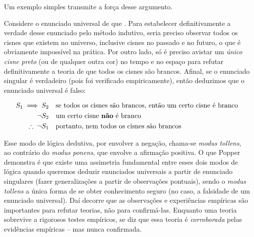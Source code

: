 \documentclass[./main.tex]{subfiles}
\begin{document}
\par Um exemplo simples transmite a força desse argumento. 

\par Considere o enunciado universal de que . Para estabelecer definitivamente a verdade desse enunciado pelo método indutivo, seria preciso observar todos os cisnes que existem no universo, inclusive cisnes no passado e no futuro, o que é obviamente impossível na prática. Por outro lado, só é preciso avistar um \textit{único cisne preto} (ou de qualquer outra cor) no tempo e no espaço para refutar definitivamente a \gls{teoria} de que todos os cisnes são brancos. Afinal, se o enunciado singular  é verdadeiro (pois foi verificado empiricamente), então deduzimos que o enunciado universal  é falso:
\begin{linenomath*}
    \begin{align*}
        S_1 \implies S_2 & \quad \textnormal{se todos os cisnes são brancos, então um certo cisne é branco} \\
        \neg S_2 & \quad \textnormal{um certo cisne \textbf{não} é branco}\\
        \therefore\;\neg S_1 & \quad \textnormal{portanto, nem todos os cisnes são brancos}
    \end{align*}
\end{linenomath*}
Esse modo de lógica dedutiva, por envolver a negação, chama-se \textit{modus tollens}, ao contrário do \textit{modus ponens}, que envolve a afirmação positiva. O que Popper demonstra é que existe uma assimetria fundamental entre esses dois modos de lógica quando queremos deduzir enunciados universais a partir de enunciado singulares (fazer generalizações a partir de observações pontuais), sendo o \textit{modus tollens} a única forma de se obter conhecimento seguro (no caso, a falsidade de um enunciado universal). Daí decorre que as observações e experiências empíricas são importantes para refutar teorias, não para confirmá-las. Enquanto uma \gls{teoria} sobrevive a rigorosos testes empíricos, se diz que essa \gls{teoria} é \textit{corroborada} pelas evidências empíricas – mas nunca confirmada.
\end{document}
